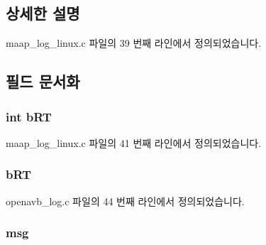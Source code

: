 \subsection{상세한 설명}


maap\+\_\+log\+\_\+linux.\+c 파일의 39 번째 라인에서 정의되었습니다.



\subsection{필드 문서화}
\subsubsection[{\texorpdfstring{b\+RT}{bRT}}]{\setlength{\rightskip}{0pt plus 5cm}int b\+RT}\hypertarget{structlog__queue__item__t_a30f8c58f5752c309e3ea89708f8dff4f}{}\label{structlog__queue__item__t_a30f8c58f5752c309e3ea89708f8dff4f}


maap\+\_\+log\+\_\+linux.\+c 파일의 41 번째 라인에서 정의되었습니다.

\subsubsection[{\texorpdfstring{b\+RT}{bRT}}]{ b\+RT}\hypertarget{structlog__queue__item__t_ac20dbee46f0cffb75595c9e14bb10d2c}{}\label{structlog__queue__item__t_ac20dbee46f0cffb75595c9e14bb10d2c}


openavb\+\_\+log.\+c 파일의 44 번째 라인에서 정의되었습니다.

\subsubsection[{\texorpdfstring{msg}{msg}}]{ msg}\hypertarget{structlog__queue__item__t_ad6dd0ed011025f01f3d77d2e437d5a10}{}\label{structlog__queue__item__t_ad6dd0ed011025f01f3d77d2e437d5a10}


